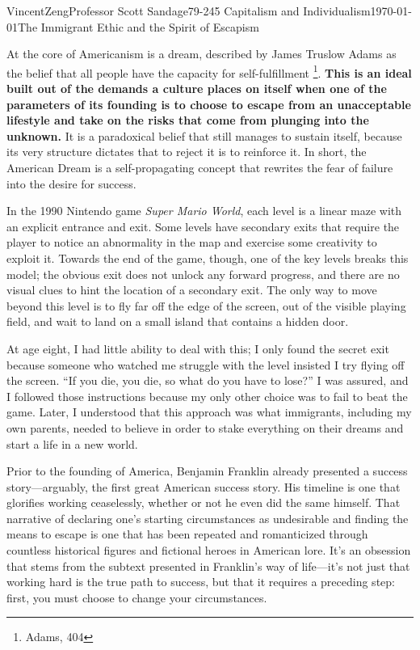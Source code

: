 \documentclass[12pt]{article}
\begin{document}
\begin{mla}{Vincent}{Zeng}{Professor Scott Sandage}{79-245 Capitalism and Individualism}{\today}{The Immigrant Ethic and the Spirit of Escapism}

At the core of Americanism is a dream, described by James Truslow Adams as the
belief that all people have the capacity for self-fulfillment \footnote{Adams,
404}. \textbf{This is an ideal built out of the demands a culture places on itself
when one of the parameters of its founding is to choose to escape from an
unacceptable lifestyle and take on the risks that come from plunging into the
unknown.} It is a paradoxical belief that still manages to sustain itself,
because its very structure dictates that to reject it is to reinforce it.
In short, the American Dream is a self-propagating concept that rewrites the
fear of failure into the desire for success.

In the 1990 Nintendo game \textit{Super Mario World}, each level is a linear maze with an
explicit entrance and exit. Some levels have secondary exits that require the
player to notice an abnormality in the map and exercise some creativity to
exploit it. Towards the end of the game, though, one of the key levels breaks this model; the obvious
exit does not unlock any forward progress, and there are no visual clues to
hint the location of a secondary exit. The only way to move beyond this
level is to fly far off the edge of the screen, out of the visible playing
field, and wait to land on a small island that contains a hidden door. 

At age eight, I had little ability to deal with this; I only found the secret
exit because someone who watched me struggle with the level insisted I try
flying off the screen. ``If you die, you die, so what do you have to lose?'' I
was assured, and I followed those instructions because my only other choice
was to fail to beat the game. Later, I understood that this approach was what immigrants, including my
own parents, needed to believe in order to stake everything on their dreams and
start a life in a new world. 

Prior to the founding of America, Benjamin Franklin already presented a
success story---arguably, the first great American success story. His
timeline is one that glorifies working ceaselessly, whether or
not he even did the same himself. That narrative of declaring one's starting
circumstances as undesirable and finding the means to escape is one that has
been repeated and romanticized through countless historical figures and
fictional heroes in American lore. It's an obsession that stems from the subtext
presented in Franklin's way of life---it's not just that working hard is the
true path to success, but that it requires a preceding step: first, you must
choose to change your circumstances.


\end{mla}
\end{document}
